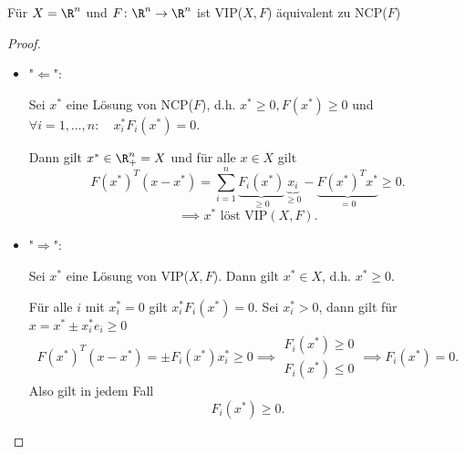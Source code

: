 \begin{lemma}
	Für $X = \R^{n}$ und $F \colon \R^{n} \rightarrow \R^{n} $ ist VIP($X,F$) äquivalent zu NCP($F$)
\end{lemma}

\begin{proof}
	\begin{itemize}
		\item "$\Longleftarrow$":

			Sei ${x}^{*}$ eine Lösung von NCP($F$), d.h. ${x}^{*}\geq 0, F({x}^{*}) \geq  0$ und $\forall i =1, \ldots, n: \quad {x}^{*}_{i} F_{i}({x}^{*}) = 0$.

			Dann gilt ${x}^{*} \in \R^{n}_{+}=X$ und für alle $x \in X$ gilt
			\[
				F({x}^{*})^{T}(x-{x}^{*}) = \sum_{i=1}^{n}{\underbrace{F_{i}({x}^{*})}_{\geq 0} \underbrace{x_{i}}_{\geq 0}} - \underbrace{F({x}^{*})^{T}{x}^{*}}_{=0} \geq 0
			.\] 
			\[
				\implies {x}^{*} \text{ löst VIP}(X,F) 
			.\] 
		\item "$\Longrightarrow$":

			Sei ${x}^{*}$ eine Lösung von VIP($X,F$). Dann gilt ${x}^{*} \in X$, d.h. ${x}^{*}\geq 0$.

			Für alle $i$ mit ${x}^{*}_{i}=0$ gilt ${x}^{*}_{i}F_{i}({x}^{*})=0$. Sei ${x}^{*}_{i}>0$, dann gilt für $x = {x}^{*} \pm {x}^{*}_{i}e_{i}\geq 0$
			\[
				F({x}^{*})^{T}(x-{x}^{*}) = \pm F_{i}({x}^{*}){x}^{*}_{i}\geq 0 \implies
				\begin{array}{r}
					F_{i}({x}^{*})\geq 0 \\
					F_{i}({x}^{*})\leq 0
				\end{array}
				\implies F_{i}({x}^{*}) = 0
			.\] 
			Also gilt in jedem Fall
			\[
				F_{i}({x}^{*})\geq  0
			.\] 
	\end{itemize}
\end{proof}

